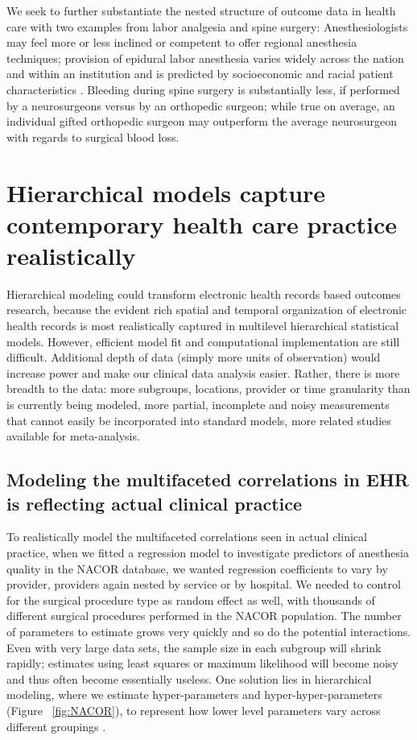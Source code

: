 \documentclass[11pt,notitlepage]{article}
\begin{document}
We seek to further substantiate the nested structure of outcome data in health care with two examples from labor analgesia and spine surgery: Anesthesiologists may feel more or less inclined or competent to offer regional anesthesia techniques; provision of epidural labor anesthesia varies widely across the nation and within an institution and is predicted by socioeconomic and racial patient characteristics \cite{Rust2004,Glance2007}. Bleeding during spine surgery is substantially less, if performed by a neurosurgeons versus by an orthopedic surgeon; while true on average, an individual gifted orthopedic surgeon may outperform the average neurosurgeon with regards to surgical blood loss.

\section*{Hierarchical models capture contemporary health care practice realistically}
Hierarchical modeling could transform electronic health records based outcomes research, because the evident rich spatial and temporal organization of electronic health records is most realistically captured in multilevel hierarchical statistical models. However, efficient model fit and computational implementation are still difficult.  Additional depth of data (simply more units of observation) would increase power and make our clinical data analysis easier. Rather, there is more breadth to the data: more subgroups, locations, provider or time granularity than is currently being modeled, more partial, incomplete and noisy measurements that cannot easily be incorporated into standard models, more related studies available for meta-analysis\cite{Andreae2015,Andreae2012}.

\subsection*{Modeling the multifaceted correlations in EHR is reflecting actual clinical practice}
To realistically model the multifaceted correlations seen in actual clinical practice, when we fitted a regression model to investigate predictors of anesthesia quality in the NACOR database, we wanted regression coefficients to vary by provider, providers again nested by service or by hospital\cite{AndreaeWhite2015}. We needed to control for the surgical procedure type as random effect as well, with thousands of different surgical procedures performed in the NACOR population. The number of parameters to estimate grows very quickly and so do the potential interactions. Even with very large data sets, the sample size in each subgroup will shrink rapidly; estimates using least squares or maximum likelihood will become noisy and thus often become essentially useless. One solution lies in hierarchical modeling, where we estimate hyper-parameters and hyper-hyper-parameters (Figure~ \ref{fig:NACOR}), to represent how lower level parameters vary across different groupings \cite{Bafumi_Gelman_2007}.
\end{document}
